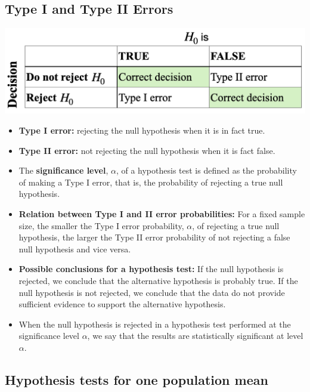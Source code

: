 \documentclass[
]{article}
\begin{document}
\hypertarget{type-i-and-type-ii-errors}{%
\subsection{Type I and Type II Errors}\label{type-i-and-type-ii-errors}}

\begin{center}\includegraphics[width=1\linewidth,height=0.8\textheight]{hypotab1} \end{center}

\begin{itemize}
\item
  \textbf{Type I error:} rejecting the null hypothesis when it is in
  fact true.
\item
  \textbf{Type II error:} not rejecting the null hypothesis when it is
  fact false.
\item
  The \textbf{significance level}, \(\alpha\), of a hypothesis test is
  defined as the probability of making a Type I error, that is, the
  probability of rejecting a true null hypothesis.
\item
  \textbf{Relation between Type I and II error probabilities:} For a
  fixed sample size, the smaller the Type I error probability,
  \(\alpha\), of rejecting a true null hypothesis, the larger the Type
  II error probability of not rejecting a false null hypothesis and vice
  versa.
\item
  \textbf{Possible conclusions for a hypothesis test:} If the null
  hypothesis is rejected, we conclude that the alternative hypothesis is
  probably true. If the null hypothesis is not rejected, we conclude
  that the data do not provide sufficient evidence to support the
  alternative hypothesis.
\item
  When the null hypothesis is rejected in a hypothesis test performed at
  the significance level \(\alpha\), we say that the results are
  statistically significant at level \(\alpha\).
\end{itemize}

\hypertarget{hypothesis-tests-for-one-population-mean}{%
\subsection{Hypothesis tests for one population
mean}\label{hypothesis-tests-for-one-population-mean}}
\end{document}
